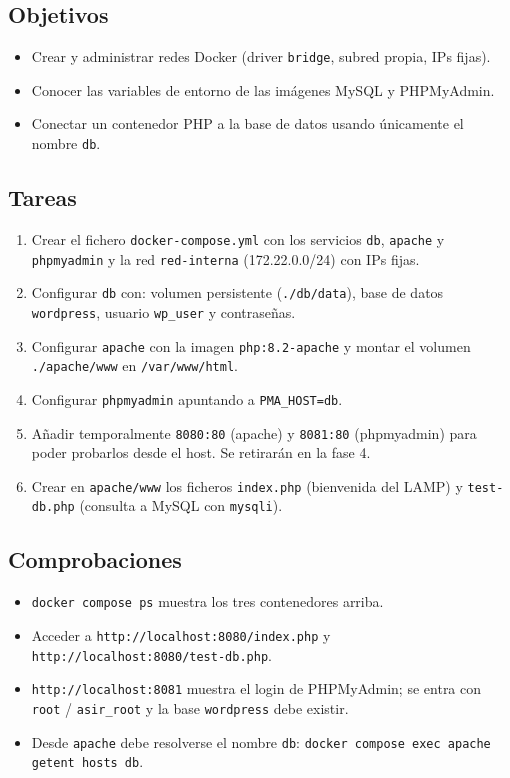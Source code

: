 \documentclass[11pt]{article}
\begin{document}
\subsection{Objetivos}
\label{sec:org0000015}
\begin{itemize}
\item Crear y administrar redes Docker (driver \texttt{bridge}, subred propia, IPs fijas).
\item Conocer las variables de entorno de las imágenes MySQL y PHPMyAdmin.
\item Conectar un contenedor PHP a la base de datos usando únicamente el nombre \texttt{db}.
\end{itemize}
\subsection{Tareas}
\label{sec:org0000018}
\begin{enumerate}
\item Crear el fichero \texttt{docker-compose.yml} con los servicios \texttt{db}, \texttt{apache} y
\texttt{phpmyadmin} y la red \texttt{red-interna} (172.22.0.0/24) con IPs fijas.
\item Configurar \texttt{db} con: volumen persistente (\texttt{./db/data}), base de datos
\texttt{wordpress}, usuario \texttt{wp\_user} y contraseñas.
\item Configurar \texttt{apache} con la imagen \texttt{php:8.2-apache} y montar el volumen
\texttt{./apache/www} en \texttt{/var/www/html}.
\item Configurar \texttt{phpmyadmin} apuntando a \texttt{PMA\_HOST=db}.
\item Añadir temporalmente \texttt{8080:80} (apache) y \texttt{8081:80} (phpmyadmin) para poder
probarlos desde el host. Se retirarán en la fase 4.
\item Crear en \texttt{apache/www} los ficheros \texttt{index.php} (bienvenida del LAMP) y
\texttt{test-db.php} (consulta a MySQL con \texttt{mysqli}).
\end{enumerate}
\subsection{Comprobaciones}
\label{sec:org000001b}
\begin{itemize}
\item \texttt{docker compose ps} muestra los tres contenedores arriba.
\item Acceder a \texttt{http://localhost:8080/index.php} y \texttt{http://localhost:8080/test-db.php}.
\item \texttt{http://localhost:8081} muestra el login de PHPMyAdmin; se entra con
\texttt{root} / \texttt{asir\_root} y la base \texttt{wordpress} debe existir.
\item Desde \texttt{apache} debe resolverse el nombre \texttt{db}:
\texttt{docker compose exec apache getent hosts db}.
\end{itemize}
\end{document}
